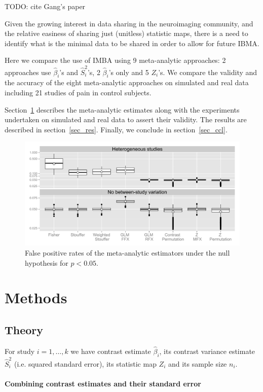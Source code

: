 \documentclass{llncs}
\newcommand{\effectvector}{\hat\beta}
\newcommand{\effect}[1][i]{\effectvector_{#1}}
\newcommand{\vareffect}[1][i]{\hat S^2_{#1}}
\newcommand{\zeffect}[1][i]{Z_{#1}}
\begin{document}
TODO: cite Gang's paper

Given the growing interest in data sharing in the neuroimaging community, and the relative easiness of sharing just (unitless) statistic maps, there is a need to identify what is the minimal data to be shared in order to allow for future IBMA.

Here we compare the use of IMBA using 9 meta-analytic approaches: 2 approaches use $\effect$'s and $\vareffect$'s, 2 $\effect$'s only and 5 $\zeffect$'s. We compare the validity and the accuracy of the eight meta-analytic approaches on simulated and real data including 21 studies of pain in control subjects.

Section~\ref{sec_meth} describes the meta-analytic estimates along with the experiments undertaken on simulated and real data to assert their validity. The results are described in section~\ref{sec_res}. Finally, we conclude in section~\ref{sec_ccl}.

\begin{figure}[t]
	\centering
	\includegraphics[width=\linewidth]{./MICCAI_version/Rplot_FPR_all.pdf}
	\caption{False positive rates of the meta-analytic estimators under the null hypothesis for $p<0.05$.}
	\label{fig_fpr_all}
\end{figure}

\section{Methods}\label{sec_meth}
\subsection{Theory}
For study $i=1,\ldots,k$ we have contrast estimate $\effect$, its contrast variance estimate $\vareffect$ (i.e. squared standard error), its statistic map $Z_i$ and its sample size $n_i$.  

\paragraph{Combining contrast estimates and their standard error}
\end{document}
